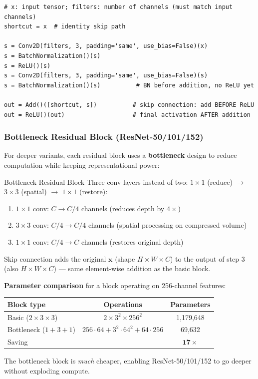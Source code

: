 \documentclass[11pt,a4paper]{article}
\newcommand{\term}[1]{\textcolor{DefGreen}{\textbf{#1}}\index{#1}}
\begin{document}
\begin{lstlisting}[caption={Basic residual block in Keras}]
# x: input tensor; filters: number of channels (must match input channels)
shortcut = x  # identity skip path

s = Conv2D(filters, 3, padding='same', use_bias=False)(x)
s = BatchNormalization()(s)
s = ReLU()(s)
s = Conv2D(filters, 3, padding='same', use_bias=False)(s)
s = BatchNormalization()(s)          # BN before addition, no ReLU yet

out = Add()([shortcut, s])          # skip connection: add BEFORE ReLU
out = ReLU()(out)                   # final activation AFTER addition
\end{lstlisting}

\subsubsection{Bottleneck Residual Block (ResNet-50/101/152)}

For deeper variants, each residual block uses a \term{bottleneck} design to reduce computation
while keeping representational power:

\begin{defbox}{Bottleneck Residual Block}
Three conv layers instead of two: $1\times1$ (reduce) $\to$ $3\times3$ (spatial) $\to$
$1\times1$ (restore):
\begin{enumerate}
  \item $1\times1$ conv: $C \to C/4$ channels (reduces depth by $4\times$)
  \item $3\times3$ conv: $C/4 \to C/4$ channels (spatial processing on compressed volume)
  \item $1\times1$ conv: $C/4 \to C$ channels (restores original depth)
\end{enumerate}
Skip connection adds the original $\mathbf{x}$ (shape $H\times W\times C$) to the output of
step 3 (also $H\times W\times C$) — same element-wise addition as the basic block.
\end{defbox}

\textbf{Parameter comparison} for a block operating on 256-channel features:
\begin{center}
\renewcommand{\arraystretch}{1.25}
\begin{tabular}{@{}lcc@{}}
\toprule
\textbf{Block type} & \textbf{Operations} & \textbf{Parameters} \\
\midrule
Basic ($2\times3\times3$)     & $2 \times 3^2 \times 256^2$ & 1{,}179{,}648 \\
Bottleneck ($1{+}3{+}1$)      & $256{\cdot}64 + 3^2{\cdot}64^2 + 64{\cdot}256$ & 69{,}632 \\
\midrule
Saving & & $\mathbf{17\times}$ \\
\bottomrule
\end{tabular}
\end{center}
The bottleneck block is \emph{much} cheaper, enabling ResNet-50/101/152 to go deeper without
exploding compute.
\end{document}
